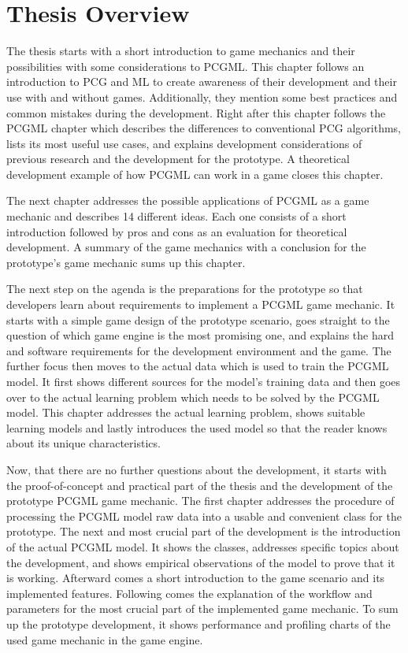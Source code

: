 \documentclass[MGS,Master,english]{twbook}%
\begin{document}
\section{Thesis Overview}
The thesis starts with a short introduction to game mechanics and their possibilities with some considerations to \ac{PCGML}. This chapter follows an introduction to \ac{PCG} and \ac{ML} to create awareness of their development and their use with and without games. Additionally, they mention some best practices and common mistakes during the development. Right after this chapter follows the \ac{PCGML} chapter which describes the differences to conventional \ac{PCG} algorithms, lists its most useful use cases, and explains development considerations of previous research and the development for the prototype. A theoretical development example of how \ac{PCGML} can work in a game closes this chapter.

The next chapter addresses the possible applications of \ac{PCGML} as a game mechanic and describes 14 different ideas. Each one consists of a short introduction followed by pros and cons as an evaluation for theoretical development. A summary of the game mechanics with a conclusion for the prototype's game mechanic sums up this chapter.

The next step on the agenda is the preparations for the prototype so that developers learn about requirements to implement a \ac{PCGML} game mechanic. It starts with a simple game design of the prototype scenario, goes straight to the question of which game engine is the most promising one, and explains the hard and software requirements for the development environment and the game. The further focus then moves to the actual data which is used to train the \ac{PCGML} model. It first shows different sources for the model's training data and then goes over to the actual learning problem which needs to be solved by the \ac{PCGML} model. This chapter addresses the actual learning problem, shows suitable learning models and lastly introduces the used model so that the reader knows about its unique characteristics.

Now, that there are no further questions about the development, it starts with the proof-of-concept and practical part of the thesis and the development of the prototype \ac{PCGML} game mechanic. The first chapter addresses the procedure of processing the \ac{PCGML} model raw data into a usable and convenient class for the prototype. The next and most crucial part of the development is the introduction of the actual \ac{PCGML} model. It shows the classes, addresses specific topics about the development, and shows empirical observations of the model to prove that it is working. Afterward comes a short introduction to the game scenario and its implemented features. Following comes the explanation of the workflow and parameters for the most crucial part of the implemented game mechanic. To sum up the prototype development, it shows performance and profiling charts of the used game mechanic in the game engine.
\end{document}
